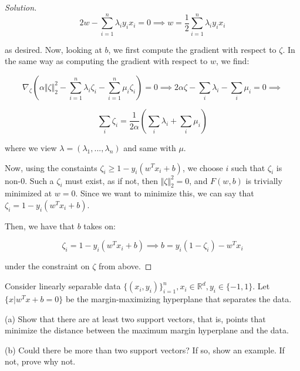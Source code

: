 \documentclass[10pt]{article}
\newenvironment{problem}[2][]{\begin{trivlist}
\item[\hskip \labelsep {\bfseries #1}\hskip \labelsep {\bfseries #2.}]}{\end{trivlist}}
\begin{document}
\begin{proof}[Solution]
$$ 2w - \sum_{i=1}^n \lambda_i y_i x_i= 0  \implies w = \frac{1}{2}  \sum_{i=1}^n \lambda_i y_i x_i $$

as desired. Now, looking at $b$, we first compute the gradient with respect to $\zeta$. In the same way as computing the gradient with respect to $w$, we find:

$$ \nabla_\zeta \left( \alpha \Vert \zeta \Vert_2^2 - \sum_{i=1}^n \lambda_i \zeta_i - \sum_{i=1}^n \mu_i \zeta_i \right) = 0 \implies 2 \alpha \zeta - \sum_i \lambda_i  - \sum_i \mu_i = 0 \implies $$

$$ \sum_i \zeta_i = \frac{1}{2 \alpha} \left( \sum_i \lambda_i + \sum_i \mu_i \right)$$

where we view $\lambda = ( \lambda_1,...,\lambda_n)$ and same with $\mu$.

Now, using the constaints $  \zeta_i \geq 1 -  y_i (w^T x_i + b)$, we choose $i$ such that $\zeta_i$ is non-0. Such a $\zeta_i$ must exist, as if not, then $\Vert \zeta \Vert_2^2 = 0$, and $F(w,b)$ is trivially minimized at $w = 0$. Since we want to minimize this, we can say that$ \zeta_i =  1 -  y_i (w^T x_i + b)$.

Then, we have that $b$ takes on:

$$ \zeta_i =  1 -  y_i (w^T x_i + b) \implies b = y_i (1- \zeta_i ) - w^T x_i $$

under the constraint on $\zeta$ from above. 


\end{proof}

\begin{problem}{Question 3}

Consider linearly separable data $\{ (x_i, y_i) \}_{i=1}^n, x_i \in \mathbb{R}^d, y_i \in \{ -1, 1 \}$. Let $\{ x | w^T x + b = 0 \}$ be the margin-maximizing hyperplane that separates the data.

(a) Show that there are at least two support vectors, that is, points that minimize the distance between the maximum margin hyperplane and the data.

(b) Could there be more than two support vectors? If so, show an example. If not, prove why not.

\end{problem}
\end{document}
